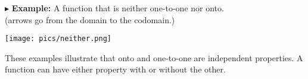 \documentclass{ximera}
\begin{document}
$\blacktriangleright$ \textbf{Example:} A function that is neither one-to-one nor onto.  \\
(arrows go from the domain to the codomain.)

\begin{image}
\texttt{[image: pics/neither.png]}
\end{image}





These examples illustrate that onto and one-to-one are independent properties.  A function can have either property with or without the other.
\end{document}
